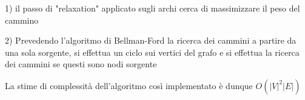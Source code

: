 \documentclass[11pt, a4paper, titlepage]{article}
\begin{document}
                1) il passo di "relaxation" applicato sugli archi cerca di massimizzare il peso del cammino
                
                2) Prevedendo l'algoritmo di Bellman-Ford la ricerca dei cammini a partire da una sola sorgente, si effettua un ciclo sui vertici del grafo e si effettua la ricerca dei cammini se questi sono nodi sorgente

                La stime di complessità dell'algoritmo così implementato è dunque 
                \begin{math}
                    O(|V|^2 |E|)
                \end{math}
\end{document}
